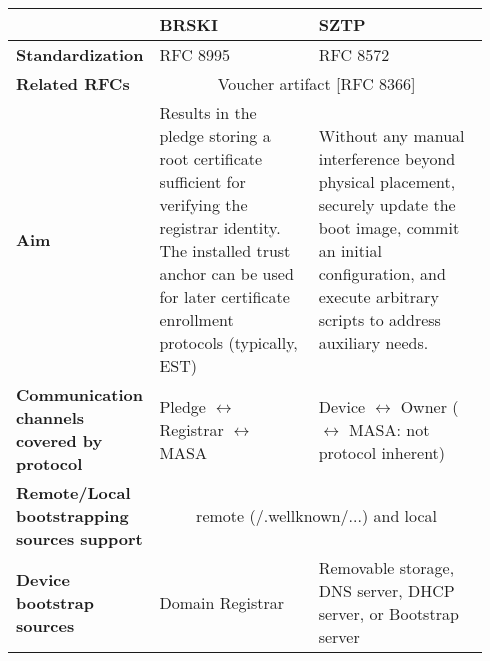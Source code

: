 
\begin{longtable}{|m{0.171\linewidth}|m{0.372\linewidth}|m{0.393\linewidth}|}
		\hline
		\rowcolor[rgb]{ .745,  .804,  .843}  & \textbf{BRSKI} & \textbf{SZTP} \bigstrut\\
		\hline
		\endhead

		\rowcolor[rgb]{ .745,  .804,  .843} \textbf{Standardization} & \cellcolor[rgb]{ 1,  1,  1}RFC 8995 & \cellcolor[rgb]{ 1,  1,  1}RFC 8572 \bigstrut\\

		\hline
		\rowcolor[rgb]{ .745,  .804,  .843} \textbf{Related RFCs} & \multicolumn{2}{c|}{\cellcolor[rgb]{ 1,  1,  1}Voucher artifact [RFC 8366]} \bigstrut\\
		\hline

		\rowcolor[rgb]{ .745,  .804,  .843} \textbf{Aim} & \multicolumn{1}{p{18.335em}|}{\cellcolor[rgb]{ 1,  1,  1}Results in the pledge storing a root certificate sufficient for verifying the registrar identity. The installed trust anchor can be used for later certificate enrollment protocols (typically, EST)} & \multicolumn{1}{p{18.335em}|}{\cellcolor[rgb]{ 1,  1,  1}Without any manual interference beyond physical placement, securely update the boot image, commit an initial configuration, and execute arbitrary scripts to address auxiliary needs.} \bigstrut\\

		\hline
		\rowcolor[rgb]{ .745,  .804,  .843} \textbf{Communication channels covered by protocol} & \cellcolor[rgb]{ 1,  1,  1}Pledge $ \leftrightarrow $ Registrar $ \leftrightarrow $ MASA & \multicolumn{1}{p{18.335em}|}{\cellcolor[rgb]{ 1,  1,  1}Device $ \leftrightarrow $ Owner ($ \leftrightarrow $ MASA: not protocol inherent)} \bigstrut\\
		\hline

		\rowcolor[rgb]{ .745,  .804,  .843} \textbf{Remote/Local bootstrapping sources support} & \multicolumn{2}{c|}{ \cellcolor[rgb]{ 1,  1,  1} remote (/.wellknown/...) and local } \bigstrut\\

		\hline
		\rowcolor[rgb]{ .745,  .804,  .843} \textbf{Device bootstrap sources} & \cellcolor[rgb]{ 1,  1,  1}Domain Registrar & \multicolumn{1}{p{18.335em}|}{\cellcolor[rgb]{ 1,  1,  1}Removable storage, DNS server, DHCP server, or Bootstrap server} \bigstrut\\


\end{longtable}

